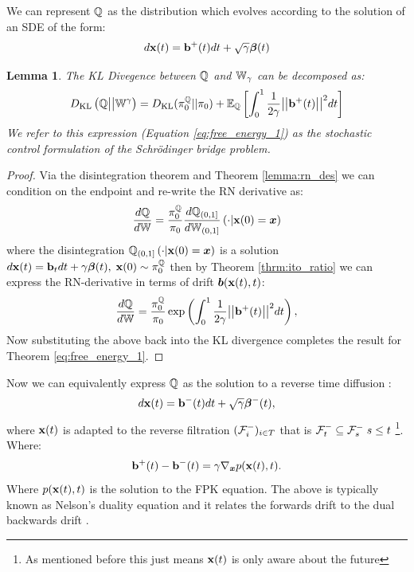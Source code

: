\documentclass[a4paper,12pt,twoside,openright]{report}
\newtheorem{lemma}[theorem]{Lemma}
\theoremstyle{definition}
\begin{document}
We can represent ${\mathbb{Q}}$ as the distribution which evolves according to the solution of an SDE of the form:
\begin{align*}
    d{\mathbf{x}}(t) = {\mathbf{b}}^{+}(t) dt + \sqrt{\gamma} {\bm{\beta}}(t)
\end{align*}
\begin{lemma}\citep{pavon1991free}
    The KL Divegence between ${\mathbb{Q}}$ and $\mathbb{W}_{\gamma}$ can be decomposed as:
\begin{align}\label{eq:free_energy_1}
     D_{\mathrm{KL}}\left({\mathbb{Q}} \big|\big| \mathbb{W}^{\gamma}\right) = D_{\mathrm{KL}}(\pi^{{\mathbb{Q}}}_0 || \pi_0) + \mathbb{E}_{\mathbb{Q}}\left[\int_0^1 \frac{1}{2\gamma}\big|\big|{\mathbf{b}}^{+}(t) \big|\big|^2 dt\right]
\end{align}
We refer to this expression (Equation \ref{eq:free_energy_1}) as the stochastic control formulation of the Schrödinger bridge problem.
\end{lemma}
\begin{proof}
Via the disintegration theorem and Theorem \ref{lemma:rn_des} we can condition on the endpoint and re-write the RN derivative as:
\begin{align*}
    \frac{d{\mathbb{Q}}}{d\mathbb{W}} = \frac{\pi_0^{\mathbb{Q}}}{\pi_0} \frac{d{\mathbb{Q}}_{(0,1]}}{d\mathbb{W}_{(0,1]}}\left(\cdot | {\mathbf{x}}(0) ={\bm{x}}\right)
\end{align*}
where the disintegration ${\mathbb{Q}}_{(0,1]}\left(\cdot | {\mathbf{x}}(0) = {\bm{x}} \right)$ is a solution $d{\mathbf{x}}(t) = {\mathbf{b}}_t dt + \gamma {\bm{\beta}}(t), \; {\mathbf{x}}(0) \sim \pi_0^{\mathbb{Q}}$ then by Theorem \ref{thrm:ito_ratio} we can express the RN-derivative in terms of  drift ${\bm{b}}({\mathbf{x}}(t), t)$:
\begin{align*}
    \frac{d{\mathbb{Q}}}{d\mathbb{W}} = \frac{\pi_0^{\mathbb{Q}}}{\pi_0}\exp\left(\int_0^1\frac{1}{2\gamma} \big|\big|{\mathbf{b}}^+(t)\big|\big|^2 dt\right),
\end{align*}
Now substituting the above back into the KL divergence completes the result for Theorem \ref{eq:free_energy_1}.
\end{proof}
Now we can equivalently express ${\mathbb{Q}}$ as the solution to a reverse time diffusion :
\begin{align}
    d{\mathbf{x}}(t) = {\mathbf{b}}^{-}(t) dt + \sqrt{\gamma} {\bm{\beta}}^{-}(t), 
\end{align}
where ${\mathbf{x}}(t)$ is adapted to the reverse filtration $({\mathcal{F}}^{-}_i)_{i\in T}$ that is ${\mathcal{F}}^{-}_t \subseteq {\mathcal{F}}^{-}_s \; s \leq t $ \footnote{As mentioned before this just means ${\mathbf{x}}(t)$  is only aware about the future}.  Where:
\begin{align}\label{eq:nelson}
    {{\mathbf{b}}^{+}(t) - {\mathbf{b}}^{-}(t)} =\gamma \nabla_{{\bm{x}}} p({\mathbf{x}}(t), t).
\end{align}
Where $p({\mathbf{x}}(t), t)$ is the solution to the FPK equation. The above is typically known as Nelson's duality equation and it relates the forwards drift to the dual backwards drift \citep{nelson1967dynamical}. 
\end{document}

